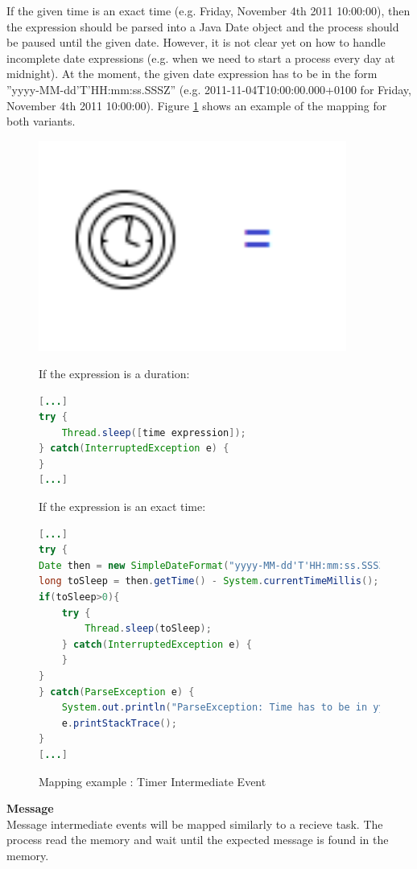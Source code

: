 If the given time is an exact time (e.g. Friday, November 4th 2011 10:00:00), then the expression should be parsed into a Java Date object and the process should be paused until the given date. However, it is not clear yet on how to handle incomplete date expressions (e.g. when we need to start a process every day at midnight). At the moment, the given date expression has to be in the form ''yyyy-MM-dd'T'HH:mm:ss.SSSZ'' (e.g. 2011-11-04T10:00:00.000+0100 for Friday, November 4th 2011 10:00:00). Figure \ref{fig:timer_intermediate}
shows an example of the mapping for both variants.
\begin{figure}[h]
\begin{minipage}[c]{0.28\textwidth}
\includegraphics[width=0.9\textwidth]{images/mapping/timer_intermediate.png}
\end{minipage}
\begin{minipage}[c]{0.72\textwidth}
If the expression is a duration:
\begin{lstlisting}[language = Java]
[...]
try {
	Thread.sleep([time expression]);
} catch(InterruptedException e) {
}
[...]
\end{lstlisting}
If the expression is an exact time:
\begin{lstlisting}[language = Java]
[...]
try {
Date then = new SimpleDateFormat("yyyy-MM-dd'T'HH:mm:ss.SSSZ").parse([time expression]);
long toSleep = then.getTime() - System.currentTimeMillis();
if(toSleep>0){
	try {
		Thread.sleep(toSleep);
	} catch(InterruptedException e) {
	}
}
} catch(ParseException e) {
	System.out.println("ParseException: Time has to be in yyyy-MM-dd'T'HH:mm:ss.SSSZ form");
	e.printStackTrace();
}
[...]
\end{lstlisting}
\end{minipage}
\caption{Mapping example : Timer Intermediate Event}%
\label{fig:timer_intermediate}%
\end{figure}
\newpage
\textbf{Message}\\
Message intermediate events will be mapped similarly to a recieve task. The process read the memory and wait until the expected message is found in the memory. 

